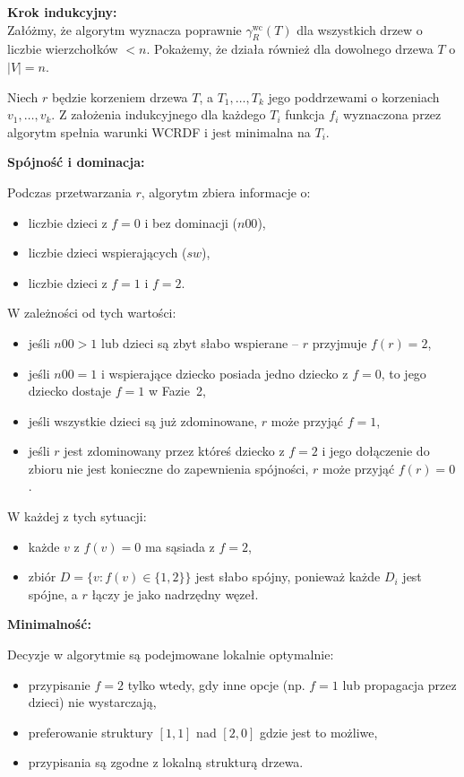 \textbf{Krok indukcyjny:}\\ 
Załóżmy, że algorytm wyznacza poprawnie $\gamma_R^{\text{wc}}(T)$ dla wszystkich drzew o liczbie wierzchołków $< n$. Pokażemy, że działa również dla dowolnego drzewa $T$ o $|V| = n$.

Niech $r$ będzie korzeniem drzewa $T$, a $T_1, \dots, T_k$ jego poddrzewami o korzeniach $v_1, \dots, v_k$. Z założenia indukcyjnego dla każdego $T_i$ funkcja $f_i$ wyznaczona przez algorytm spełnia warunki WCRDF i jest minimalna na $T_i$.

\textbf{Spójność i dominacja:}

Podczas przetwarzania $r$, algorytm zbiera informacje o:
\begin{itemize}
\item liczbie dzieci z $f=0$ i bez dominacji ($n00$),
\item liczbie dzieci wspierających ($sw$),
\item liczbie dzieci z $f=1$ i $f=2$.
\end{itemize}

W zależności od tych wartości:
\begin{itemize}
\item jeśli $n00 > 1$ lub dzieci są zbyt słabo wspierane – $r$ przyjmuje $f(r) = 2$,
\item jeśli $n00 = 1$ i wspierające dziecko posiada jedno dziecko z $f=0$, to jego dziecko dostaje $f=1$ w Fazie~2,
\item jeśli wszystkie dzieci są już zdominowane, $r$ może przyjąć $f = 1$,
\item jeśli $r$ jest zdominowany przez któreś dziecko z $f = 2$ i jego dołączenie do zbioru nie jest konieczne do zapewnienia spójności, $r$ może przyjąć $f(r) = 0$.
\end{itemize}

W każdej z tych sytuacji:
\begin{itemize}
\item każde $v$ z $f(v)=0$ ma sąsiada z $f=2$,
\item zbiór $D = \{v : f(v) \in \{1,2\}\}$ jest słabo spójny, ponieważ każde $D_i$ jest spójne, a $r$ łączy je jako nadrzędny węzeł.
\end{itemize}

\textbf{Minimalność:}

Decyzje w algorytmie są podejmowane lokalnie optymalnie:
\begin{itemize}
\item przypisanie $f = 2$ tylko wtedy, gdy inne opcje (np. $f=1$ lub propagacja przez dzieci) nie wystarczają,
\item preferowanie struktury $[1,1]$ nad $[2,0]$ gdzie jest to możliwe,
\item przypisania są zgodne z lokalną strukturą drzewa.
\end{itemize}

